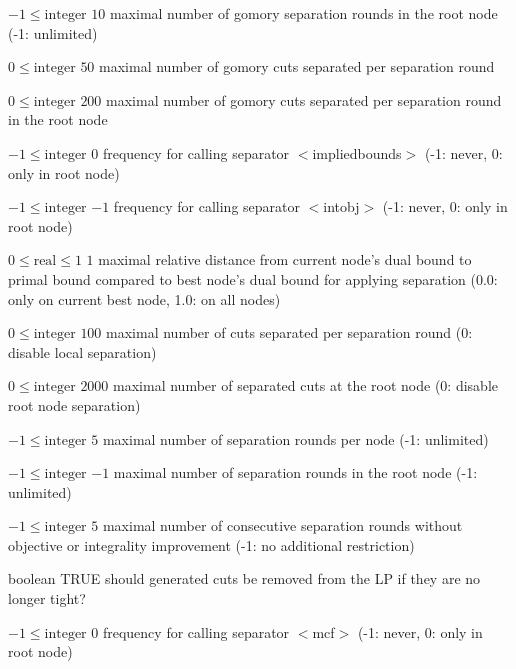 %
{$-1\leq\textrm{integer}$}%
{$10$}%
{maximal number of gomory separation rounds in the root node (-1: unlimited)}%
{}

%
{$0\leq\textrm{integer}$}%
{$50$}%
{maximal number of gomory cuts separated per separation round}%
{}

%
{$0\leq\textrm{integer}$}%
{$200$}%
{maximal number of gomory cuts separated per separation round in the root node}%
{}

%
{$-1\leq\textrm{integer}$}%
{$0$}%
{frequency for calling separator $<$impliedbounds$>$ (-1: never, 0: only in root node)}%
{}

%
{$-1\leq\textrm{integer}$}%
{$-1$}%
{frequency for calling separator $<$intobj$>$ (-1: never, 0: only in root node)}%
{}

%
{$0\leq\textrm{real}\leq1$}%
{$1$}%
{maximal relative distance from current node's dual bound to primal bound compared to best node's dual bound for applying separation (0.0: only on current best node, 1.0: on all nodes)}%
{}

%
{$0\leq\textrm{integer}$}%
{$100$}%
{maximal number of cuts separated per separation round (0: disable local separation)}%
{}

%
{$0\leq\textrm{integer}$}%
{$2000$}%
{maximal number of separated cuts at the root node (0: disable root node separation)}%
{}

%
{$-1\leq\textrm{integer}$}%
{$5$}%
{maximal number of separation rounds per node (-1: unlimited)}%
{}

%
{$-1\leq\textrm{integer}$}%
{$-1$}%
{maximal number of separation rounds in the root node (-1: unlimited)}%
{}

%
{$-1\leq\textrm{integer}$}%
{$5$}%
{maximal number of consecutive separation rounds without objective or integrality improvement (-1: no additional restriction)}%
{}

%
{boolean}%
{TRUE}%
{should generated cuts be removed from the LP if they are no longer tight?}%
{}

%
{$-1\leq\textrm{integer}$}%
{$0$}%
{frequency for calling separator $<$mcf$>$ (-1: never, 0: only in root node)}%
{}

